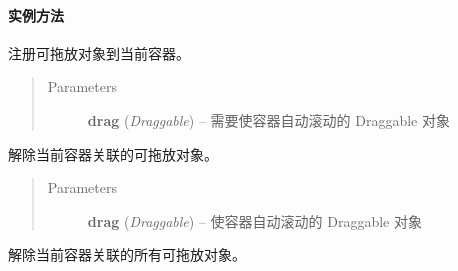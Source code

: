 \documentclass[letterpaper,10pt,english]{sphinxmanual}
\begin{document}
\begin{fulllineitems}
\begin{quote}
\begin{description}
\begin{fulllineitems}
\end{fulllineitems}



\end{description}\end{quote}

\end{fulllineitems}



\paragraph{实例方法}
\label{api/component/dd/scroll:id3}

\begin{fulllineitems}
\label{api/component/dd/scroll:DD.Scroll.attach}
注册可拖放对象到当前容器。
\begin{quote}\begin{description}
\item[{Parameters}] \leavevmode
\textbf{drag} (\emph{Draggable}) -- 需要使容器自动滚动的 Draggable 对象

\end{description}\end{quote}

\end{fulllineitems}



\begin{fulllineitems}
\label{api/component/dd/scroll:DD.Scroll.unAttach}
解除当前容器关联的可拖放对象。
\begin{quote}\begin{description}
\item[{Parameters}] \leavevmode
\textbf{drag} (\emph{Draggable}) -- 使容器自动滚动的 Draggable 对象

\end{description}\end{quote}

\end{fulllineitems}



\begin{fulllineitems}
\label{api/component/dd/scroll:DD.Scroll.destroy}
解除当前容器关联的所有可拖放对象。

\end{fulllineitems}
\end{document}
